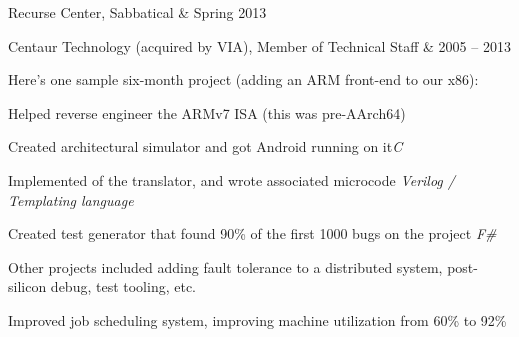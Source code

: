 \documentclass[letterpaper]{scrartcl}
\begin{document}
\begin{list1}
\item \begin{tabular1bold} Recurse Center, Sabbatical & Spring 2013 \end{tabular1bold}

\item \begin{tabular1bold} Centaur Technology (acquired by VIA), Member of Technical Staff & 2005 -- 2013 \end{tabular1bold}

  \begin{list2}

  \item Here's one sample six-month project (adding an ARM front-end to our x86):
    \begin{list3}
    \item Helped reverse engineer the ARMv7 ISA (this was pre-AArch64)
    \item Created architectural simulator and got Android running on it\hfill \emph{C}
    \item Implemented  of the translator, and wrote associated microcode \hfill \emph{Verilog / Templating language}
    \item Created test generator that found 90\% of the first 1000 bugs on the project \hfill \emph{F\#}
    \end{list3}

  \item Other projects included adding fault tolerance to a distributed system, post-silicon debug, test tooling, etc.

    \begin{list3}
    \item Improved job scheduling system, improving machine utilization from 60\% to 92\%
    \end{list3}

  \end{list2}


\end{list1}
\end{document}
